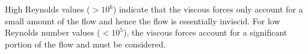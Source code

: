 
High Reynolds values ($> 10^{6}$) indicate that the viscous forces only account for a small amount of the flow and hence the flow is essentially inviscid. For low Reynolds number values ($< 10^{5}$), the viscous forces account for a significant portion of the flow and must be considered.\\




